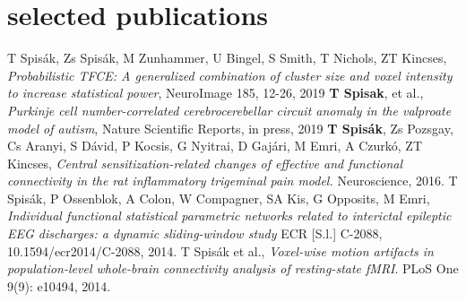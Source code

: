 \documentclass[a4paper]{twentysecondcv} %
\begin{document}
\begin{twentyshort} %
\end{twentyshort}
\vspace{0.1cm}

\section{selected publications}

\vspace{-0.1cm}
\small

T Spis\'ak\color{gray}, Zs Spis\'ak, M Zunhammer, U Bingel, S Smith, T Nichols, ZT Kincses,
\textit{\color{black}Probabilistic TFCE: A generalized combination of cluster size and voxel intensity to increase statistical power}, NeuroImage 185, 12-26, 2019\newline
\textbf{T Spisak}, et al., \textit{\color{black}Purkinje cell number-correlated cerebrocerebellar circuit anomaly in the valproate model of autism}, Nature  Scientific Reports, in press, 2019 \newline
\textbf{T Spis\'ak}, \color{gray} Zs Pozsgay, Cs Aranyi, S D\'avid, P Kocsis, G Nyitrai, D Gaj\'ari, M Emri, A Czurk\'o, ZT Kincses, \textit{\color{black}Central sensitization-related changes of effective and functional connectivity in the rat inflammatory trigeminal pain model.} Neuroscience, 2016. \newline 
{\color{black}T Spis\'ak}, P Ossenblok, A Colon, W Compagner, SA Kis, G Opposits, M Emri, \textit{\color{black}Individual functional statistical parametric networks related to interictal epileptic EEG discharges: a dynamic sliding-window study} ECR [S.l.] C-2088, 10.1594/ecr2014/C-2088, 2014.  \newline 
{\color{black}T Spis\'ak} et al., \textit{\color{black} Voxel-wise motion artifacts in population-level whole-brain connectivity analysis of resting-state fMRI}. PLoS One 9(9): e10494, 2014.
\end{document}
